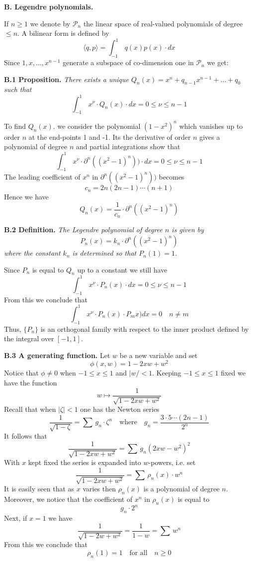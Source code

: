 \documentclass{amsart}
\def\uuu{_}
\begin{document}
\bigskip

\centerline{\bf{B. Legendre polynomials.}}
\bigskip


\noindent
If $n\geq 1$ we denote by $\mathcal P_n$ the linear space of real-valued
polynomials of degree $\leq n$. A bilinear form
is defined by
\[
\langle q,p\rangle=
\int_{-1}^1\, q(x)p(x)\cdot dx
\]
Since 
$1,x,\ldots,x^{n-1}$ generate a subspace of  co-dimension  one
in $\mathcal P\uuu n$ we get:

\medskip

\noindent
{\bf {B.1 Proposition.}}
\emph{There exists a unique 
$Q_n(x)= x^n+q_{n-1}x^{n-1}+\ldots+q_0$
such that}
\[
\int_{-1}^1\, x^\nu\cdot Q_n(x)\cdot dx=0\leq  \nu\leq n-1
\]
\medskip

\noindent
To find $Q_n(x)$.
we consider the polynomial $(1-x^2)^n$ which vanishes up to order
$n$ at the  end-points 1 and -1. 
Its the derivative of order $n$ gives a polynomial of  degree $n$
and partial integrations show that
\[
\int_{-1}^1\, x^\nu\cdot \partial^n((x^2-1)^n))\cdot dx=0\leq  \nu\leq n-1
\]
The leading coefficient of $x^n$ 
in $\partial^n((x^2-1)^n))$
becomes
\[
c_n=2n(2n-1)\cdots (n+1)
\]
Hence we have
\[ Q_n(x)=\frac{1}{c_n}\cdot \partial ^n((x^2-1)^n)
\]
\medskip

\noindent
{\bf B.2 Definition.}
\emph{The Legendre polynomial of degree
$n$ is  given by}
\[
P_n(x)=k_n\cdot\partial ^n((x^2-1)^n)
\]
\emph{where the constant $k\uuu n$ is determined so that
$P\uuu n(1)=1$.}

\medskip

\noindent
Since $P_n$ is equal to $Q_n$ up to a constant we still have
\[
\int_{-1}^1\, x^\nu\cdot P_n(x)\cdot dx=0\leq  \nu\leq n-1
\]
From this we conclude that 
\[
\int_{-1}^1\, x^\nu\cdot P_n(x)\cdot P_mx)dx=0\quad  n\neq m
\]
Thus, $\{P_n\}$ is an orthogonal family
with respect to the inner product defined by the integral over
$[-1,1]$.
\medskip

\noindent
{\bf B.3 A generating function.}
Let $w$ be a new variable and set
\[
\phi(x,w)=1-2xw+w^2
\]
Notice that $\phi\neq 0$ when
$-1\leq x\leq 1$ and $|w/<1$.
Keeping $-1\leq x\leq 1$ fixed
we have the function
\[ 
w\mapsto
\frac{1}{\sqrt{1-2xw+w^2}}
\]
Recall that when  $|\zeta|<1$ one has the Newton series
\[
\frac{1}{\sqrt{1-\zeta}}=\sum\, g_n\cdot \zeta^n\quad
\text{where}\quad g_n=\frac{3\cdot5\cdots(2n-1)}{2^n}
\]
It follows that
\[
\frac{1}{\sqrt{1-2xw+w^2}}=\sum\, g_n(2xw-w^2)^2
\]
With $x$ kept fixed the series is expanded into $w$-powers, i.e.  set
\[
\frac{1}{\sqrt{1-2xw+w^2}}=\sum\, \rho_n(x)\cdot w^n
\]
It is easily seen that as $x$ varies then
$\rho_n(x)$ is a polynomial of degree
$n$. Moreover, we notice that the coefficient of
$x^n$ in $\rho_n(x)$ is equal to
\[
g_n\cdot 2^n
\]
Next, if $x=1$ we have
\[
\frac{1}{\sqrt{1-2w+w^2}}= \frac{1}{1-w}= \sum\, w^n
\]
From this we conclude that
\[ 
\rho_n(1)=1\quad\text{for all}\quad n\geq 0
\]
\medskip
\end{document}
